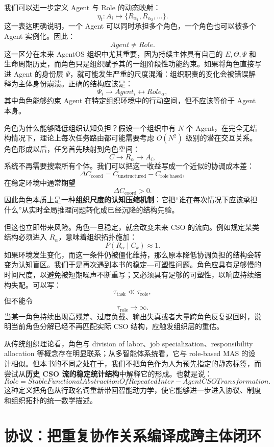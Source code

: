 我们可以进一步定义 Agent 与 Role 的动态映射：
\[
\eta_t:A_i\mapsto\{R_{\alpha_1},R_{\alpha_2},\ldots\}.
\]
这一表达明确说明，一个 Agent 可以同时承担多个角色，一个角色也可以被多个 Agent 实例化。因此：
\[
\boxed{
Agent\neq Role.
}
\]
这一区分在未来 AgentOS 组织中尤其重要，因为持续主体具有自己的 $E,\Theta,\Psi$ 和生命周期历史，而角色只是组织赋予其的一组阶段性功能约束。如果将角色直接写进 Agent 的身份层 $\Psi$，就可能发生严重的尺度混淆：组织职责的变化会被错误解释为主体身份崩溃。正确的结构应该是：
\[
\Psi_i
\longrightarrow
Agent_i
\longleftrightarrow
Role_\alpha,
\]
其中角色能够约束 Agent 在特定组织环境中的行动空间，但不应该等价于 Agent 本身。

角色为什么能够降低组织认知负担？假设一个组织中有 $N$ 个 Agent，在完全无结构情况下，理论上每次任务路由都可能需要考虑 $O(N^2)$ 级别的潜在交互关系。角色形成以后，任务首先映射到角色空间：
\[
C
\rightarrow
R_\alpha
\rightarrow
A_i,
\]
系统不再需要搜索所有个体。我们可以把这一收益写成一个近似的协调成本差：
\[
\Delta C_{\mathrm{coord}}
=
C_{\mathrm{unstructured}}
-
C_{\mathrm{role\ based}},
\]
在稳定环境中通常期望
\[
\Delta C_{\mathrm{coord}}>0.
\]
因此角色本质上是一种\textbf{组织尺度的认知压缩机制}：它把“谁在每次情况下应该承担什么”从实时全局推理问题转化成已经沉降的结构先验。

但这也立即带来风险。角色一旦稳定，就会改变未来 CSO 的流向。例如规定某类结构必须进入 $R_\alpha$，意味着组织拓扑施加：
\[
P(R_\alpha\mid C_k)\approx 1.
\]
如果环境发生变化，而这一条件仍被僵化维持，那么原本降低协调负担的结构会转变为认知盲区。我们于是再次遇到本书的稳定—可塑性问题。角色应具有足够慢的时间尺度，以避免被短期噪声不断重写；又必须具有足够的可塑性，以响应持续结构失配。可以写：
\[
\tau_{\mathrm{task}}
\ll
\tau_{\mathrm{role}},
\]
但不能令
\[
\tau_{\mathrm{role}}\rightarrow\infty.
\]
当某一角色持续出现高残差、过度负载、输出失真或者大量跨角色反复退回时，说明当前角色分解已经不再匹配实际 CSO 结构，应触发组织层的重估。

从传统组织理论看，角色与 division of labor、job specialization、responsibility allocation 等概念存在明显联系；从多智能体系统看，它与 role-based MAS 的设计相似。但本书的不同之处在于，我们不把角色作为人为预先指定的静态标签，而尝试从\textbf{历史 CSO 流的稳定统计结构}中解释它的形成。也就是说：
\[
\boxed{
Role
=
StableFunctionalAbstractionOfRepeatedInter-AgentCSOTransformation.
}
\]
这种定义把角色从行政名词重新带回智能动力学，使它能够进一步进入协议、制度和组织拓扑的统一数学描述。


\section{协议：把重复协作关系编译成跨主体闭环}
\label{sec:organizational-protocol}

